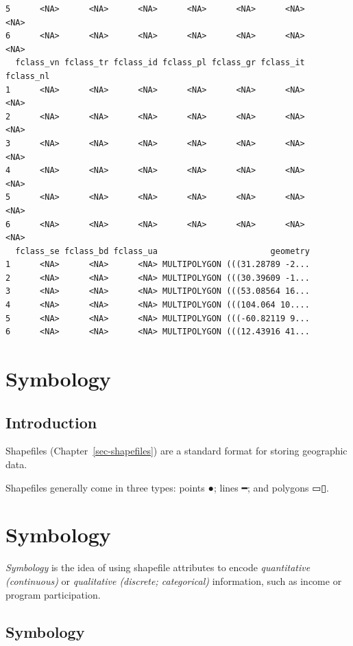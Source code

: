 \documentclass[
  letterpaper,
  DIV=11,
  numbers=noendperiod,
  oneside]{scrreprt}
\begin{document}
\begin{verbatim}
5      <NA>      <NA>      <NA>      <NA>      <NA>      <NA>      <NA>
6      <NA>      <NA>      <NA>      <NA>      <NA>      <NA>      <NA>
  fclass_vn fclass_tr fclass_id fclass_pl fclass_gr fclass_it fclass_nl
1      <NA>      <NA>      <NA>      <NA>      <NA>      <NA>      <NA>
2      <NA>      <NA>      <NA>      <NA>      <NA>      <NA>      <NA>
3      <NA>      <NA>      <NA>      <NA>      <NA>      <NA>      <NA>
4      <NA>      <NA>      <NA>      <NA>      <NA>      <NA>      <NA>
5      <NA>      <NA>      <NA>      <NA>      <NA>      <NA>      <NA>
6      <NA>      <NA>      <NA>      <NA>      <NA>      <NA>      <NA>
  fclass_se fclass_bd fclass_ua                       geometry
1      <NA>      <NA>      <NA> MULTIPOLYGON (((31.28789 -2...
2      <NA>      <NA>      <NA> MULTIPOLYGON (((30.39609 -1...
3      <NA>      <NA>      <NA> MULTIPOLYGON (((53.08564 16...
4      <NA>      <NA>      <NA> MULTIPOLYGON (((104.064 10....
5      <NA>      <NA>      <NA> MULTIPOLYGON (((-60.82119 9...
6      <NA>      <NA>      <NA> MULTIPOLYGON (((12.43916 41...
\end{verbatim}

\chapter{Symbology}\label{sec-symbology}

\section{Introduction}\label{introduction-3}

Shapefiles (Chapter~\ref{sec-shapefiles}) are a standard format for
storing geographic data.

Shapefiles generally come in three types: points {●}; lines {━}; and
polygons {▭▯}.

\chapter{Symbology}\label{symbology}

\emph{Symbology} is the idea of using shapefile attributes to encode
\emph{quantitative (continuous)} or \emph{qualitative (discrete;
categorical)} information, such as income or program participation.

\section{Symbology}
\end{document}
